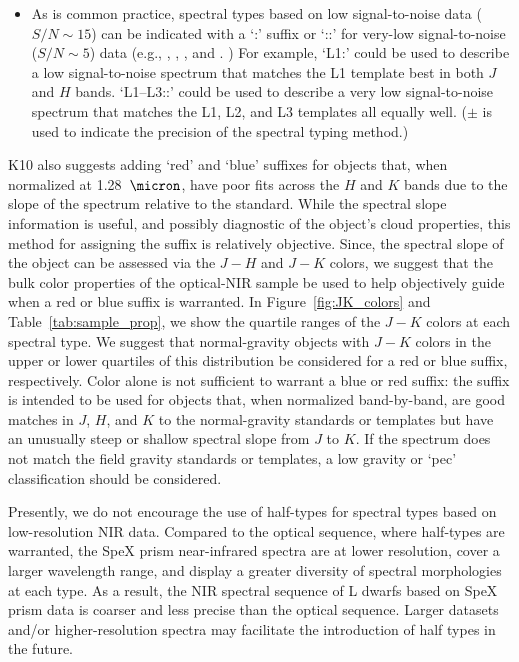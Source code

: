 \documentclass[12pt,preprint]{aastex}
\begin{document}
\begin{itemize}
	\item As is common practice, spectral types based on low signal-to-noise data ($S/N\sim15$) can be indicated with a `:' suffix or `::' for very-low signal-to-noise ($S/N\sim5$) data (e.g., \citet{Sanduleak:1988fn}, \cite{Silvestri:2006el}, \cite[Table 12.1]{Gray:2009wd}, and \cite{Covey:2010de}. ) For example, `L1:' could be used to describe a low signal-to-noise spectrum that matches the L1 template best in both $J$ and $H$ bands. `L1--L3::' could be used to describe a very low signal-to-noise spectrum that matches the L1, L2, and L3 templates all equally well. ($\pm$ is used to indicate the precision of the spectral typing method.)

\end{itemize}	

K10 also suggests adding `red' and `blue' suffixes for objects that, when normalized at 1.28~$\micron$, have poor fits across the $H$ and $K$ bands due to the slope of the spectrum relative to the standard. 
While the spectral slope information is useful, and possibly diagnostic of the object's cloud properties, this method for assigning the suffix is relatively objective.
Since, the spectral slope of the object can be assessed via the $J-H$ and $J-K$ colors, we suggest that the bulk color properties of the optical-NIR sample be used to help objectively guide when a red or blue suffix is warranted.
In Figure~\ref{fig:JK_colors} and Table~\ref{tab:sample_prop}, we show the quartile ranges of the $J-K$ colors at each spectral type. 
We suggest that normal-gravity objects with $J-K$ colors in the upper or lower quartiles of this distribution be considered for a red or blue suffix, respectively. 
Color alone is not sufficient to warrant a blue or red suffix: the suffix is intended to be used for objects that, when normalized band-by-band, are good matches in $J$, $H$, and $K$ to the normal-gravity standards or templates but have an unusually steep or shallow spectral slope from $J$ to $K$.
If the spectrum does not match the field gravity standards or templates, a low gravity or `pec' classification should be considered.

Presently, we do not encourage the use of half-types for spectral types based on low-resolution NIR data. 
Compared to the optical sequence, where half-types are warranted, the SpeX prism near-infrared spectra are at lower resolution, cover a larger wavelength range, and display a greater diversity of spectral morphologies at each type. 
As a result, the NIR spectral sequence of L dwarfs based on SpeX prism data is coarser and less precise than the optical sequence.
Larger datasets and/or higher-resolution spectra may facilitate the introduction of half types in the future.
\end{document}
